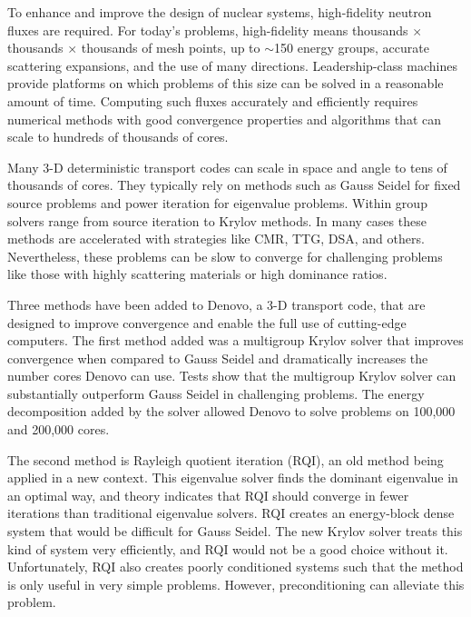 
\noindent       %
To enhance and improve the design of nuclear systems, high-fidelity neutron fluxes are required. For today's problems, high-fidelity means thousands $\times$ thousands $\times$ thousands of mesh points, up to $\sim$150 energy groups, accurate scattering expansions, and the use of many directions. Leadership-class machines provide platforms on which problems of this size can be solved in a reasonable amount of time. Computing such fluxes accurately and efficiently requires numerical methods with good convergence properties and algorithms that can scale to hundreds of thousands of cores. 

\vspace*{0.5em}
\noindent       %
Many 3-D deterministic transport codes can scale in space and angle to tens of thousands of cores. They typically rely on methods such as Gauss Seidel for fixed source problems and power iteration for eigenvalue problems. Within group solvers range from source iteration to Krylov methods. In many cases these methods are accelerated with strategies like CMR, TTG, DSA, and others. Nevertheless, these problems can be slow to converge for challenging problems like those with highly scattering materials or high dominance ratios. 

\vspace*{0.5em}
\noindent       %
Three methods have been added to Denovo, a 3-D \Sn transport code, that are designed to improve convergence and enable the full use of cutting-edge computers. The first method added was a multigroup Krylov solver that improves convergence when compared to Gauss Seidel and dramatically increases the number cores Denovo can use. Tests show that the multigroup Krylov solver can substantially outperform Gauss Seidel in challenging problems. The energy decomposition added by the solver allowed Denovo to solve problems on 100,000 and 200,000 cores. 

\vspace*{0.5em}
\noindent       %
The second method is Rayleigh quotient iteration (RQI), an old method being applied in a new context. This eigenvalue solver finds the dominant eigenvalue in an optimal way, and theory indicates that RQI should converge in fewer iterations than traditional eigenvalue solvers. RQI creates an energy-block dense system that would be difficult for Gauss Seidel. The new Krylov solver treats this kind of system very efficiently, and RQI would not be a good choice without it. Unfortunately, RQI also creates poorly conditioned systems such that the method is only useful in very simple problems. However, preconditioning can alleviate this problem. 

